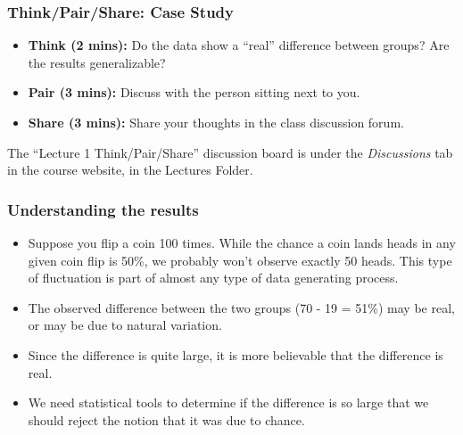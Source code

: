 \documentclass[slidestop,compress,mathserif]{beamer}
\begin{document}
\begin{frame}
	\frametitle{Think/Pair/Share: Case Study}
	\begin{itemize}
		\item \textbf{Think (2 mins):} Do the data show a ``real'' difference between groups? Are the results generalizable?
		\item \textbf{Pair (3 mins):} Discuss with the person sitting next to you.
		\item \textbf{Share (3 mins):} Share your thoughts in the class discussion forum.
	\end{itemize}

	The ``Lecture 1 Think/Pair/Share'' discussion board is under the \textit{Discussions} tab in the course website, in the Lectures Folder. 
\end{frame}

\begin{frame}
\frametitle{Understanding the results}



\begin{itemize}

\item Suppose you flip a coin 100 times. While the chance a coin lands heads in any given coin flip is 50\%, we probably won't observe exactly 50 heads. This type of fluctuation is part of almost any type of data generating process.

\item The observed difference between the two groups (70 - 19 = 51\%) may be real, or may be due to natural variation.

\item Since the difference is quite large, it is more believable that the difference is real.

\item We need statistical tools to determine if the difference is so large that we should reject the notion that it was due to chance.

\end{itemize}

\end{frame}

\end{document}
